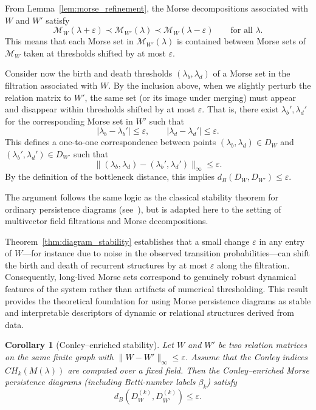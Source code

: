 \documentclass{article}
\theoremstyle{definition}
\theoremstyle{plain}
\newtheorem{corollary}{Corollary}
\theoremstyle{remark}
\newcommand{\1}{\mathbbm{1}}  %
\renewenvironment{proof}{{\bf Proof:\ }}{\qedsymbol}%
\begin{document}
\begin{proof}
From Lemma~\ref{lem:morse_refinement}, the Morse decompositions associated
with $W$ and $W'$ satisfy
\[
\mathcal M_W(\lambda+\varepsilon)
  \prec
\mathcal M_{W'}(\lambda)
  \prec
\mathcal M_W(\lambda-\varepsilon)
  \qquad \text{for all }\lambda.
\]
This means that each Morse set in $\mathcal M_{W'}(\lambda)$ is contained
between Morse sets of $\mathcal M_W$ taken at thresholds shifted by at
most $\varepsilon$.

Consider now the birth and death thresholds $(\lambda_b,\lambda_d)$ of a
Morse set in the filtration associated with $W$.
By the inclusion above, when we slightly perturb the relation matrix to
$W'$, the same set (or its image under merging) must appear and disappear
within thresholds shifted by at most $\varepsilon$.
That is, there exist $\lambda_b',\lambda_d'$ for the corresponding Morse
set in $W'$ such that
\[
|\lambda_b - \lambda_b'| \le \varepsilon,
\qquad
|\lambda_d - \lambda_d'| \le \varepsilon.
\]
This defines a one-to-one correspondence between points
$(\lambda_b,\lambda_d) \in D_W$ and
$(\lambda_b',\lambda_d') \in D_{W'}$
such that
\[
\|(\lambda_b,\lambda_d) - (\lambda_b',\lambda_d')\|_\infty \le \varepsilon.
\]
By the definition of the bottleneck distance, this implies
$d_B(D_W, D_{W'}) \le \varepsilon$.

The argument follows the same logic as the classical stability theorem
for ordinary persistence diagrams
(see~\cite{cohen2005stability, chazal2016structure}), 
but is adapted here to the setting of multivector field filtrations and
Morse decompositions.
\end{proof}

\medskip
\noindent 
Theorem~\ref{thm:diagram_stability} establishes that a small change $\varepsilon$ in any entry of $W$---for
instance due to noise in the observed transition probabilities---can
shift the birth and death of recurrent structures by at most $\varepsilon$
along the filtration.
Consequently, long-lived Morse sets correspond to genuinely robust
dynamical features of the system rather than artifacts of numerical
thresholding.
This result provides the theoretical foundation for using Morse
persistence diagrams as stable and interpretable descriptors of dynamic
or relational structures derived from data.
\begin{corollary}[Conley--enriched stability]
\label{cor:conley_stability}
Let $W$ and $W'$ be two relation matrices on the same finite graph with
$\|W - W'\|_\infty \le \varepsilon$.
Assume that the Conley indices $CH_k(M(\lambda))$ are computed over a
fixed field.
Then the Conley--enriched Morse persistence diagrams
(including Betti-number labels $\beta_k$) satisfy
\[
d_B(D_W^{(k)}, D_{W'}^{(k)}) \le \varepsilon.
\]
\end{corollary}
\end{document}
